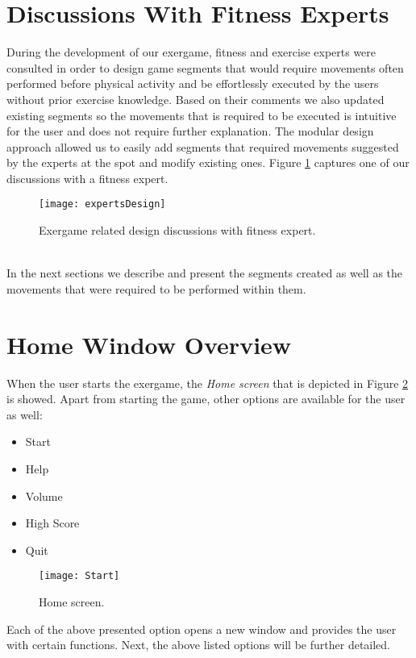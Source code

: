 \section{Discussions With Fitness Experts}
During the development of our exergame, fitness and exercise experts were consulted in order to design game segments that would require movements often performed before physical activity and be effortlessly executed by the users without prior exercise knowledge. Based on their comments we also updated existing segments so the movements that is required to be executed is intuitive for the user and does not require further explanation. The modular design approach allowed us to easily add segments that required movements suggested by the experts at the spot and modify existing ones. Figure \ref{fig:expDesign} captures one of our discussions with a fitness expert.\\  
 \begin{figure}[h]
    \centering
    \texttt{[image: expertsDesign]}
    \caption{Exergame related design discussions with fitness expert.}
    \label{fig:expDesign}
\end{figure}\\
In the next sections we describe and present the segments created as well as the movements that were required to be performed within them.\pagebreak
\section{Home Window Overview}
When the user starts the exergame, the \textit{Home screen} that is depicted in Figure \ref{fig:start} is showed. Apart from starting the game, other options are available for the user as well:
\begin{itemize}
\item Start
\item Help
\item Volume
\item High Score
\item Quit
\end{itemize}
\begin{figure}[h]
    \centering
    \texttt{[image: Start]}
    \caption{Home screen.}
    \label{fig:start}
\end{figure}
Each of the above presented option opens a new window and provides the user with certain functions. Next, the above listed options will be further detailed.\pagebreak
